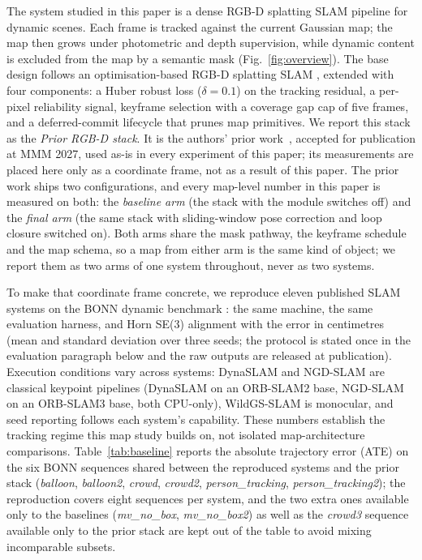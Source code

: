 \documentclass[10pt,twocolumn,letterpaper]{article}
\begin{document}
The system studied in this paper is a dense RGB-D splatting SLAM pipeline for dynamic
scenes. Each frame is tracked against the current Gaussian map; the map then grows under
photometric and depth supervision, while dynamic content is excluded from the map by a
semantic mask (Fig.~\ref{fig:overview}). The base design follows an optimisation-based
RGB-D splatting SLAM
\cite{MonoGS}, extended with four components: a Huber robust loss ($\delta=0.1$) on the
tracking residual, a per-pixel reliability signal, keyframe selection with a coverage gap
cap of five frames, and a deferred-commit lifecycle that prunes map primitives.
We report this stack as the \emph{Prior RGB-D stack}. It is the authors' prior work~\cite{RoGSSLAM},
accepted for publication at MMM 2027, used as-is in every experiment of this paper; its measurements are
placed here only as a coordinate frame, not as a result of this paper. %
The prior work ships two configurations, and every map-level number in this paper is
measured on both: the \emph{baseline arm} (the stack with the module switches off) and
the \emph{final arm} (the same stack with sliding-window pose correction and loop
closure switched on). Both arms share the mask pathway, the keyframe schedule and the
map schema, so a map from either arm is the same kind of object; we report them as
two arms of one system throughout, never as two systems. %

To make that coordinate frame concrete, we reproduce eleven published SLAM systems on the
BONN dynamic benchmark \cite{BonnDataset}: the same machine, the same
evaluation harness, and Horn SE(3) alignment with the error in centimetres (mean and
standard deviation over three seeds; the protocol is stated once in the evaluation
paragraph below and the raw outputs are released at publication). Execution
conditions vary across systems: DynaSLAM and NGD-SLAM are classical keypoint
pipelines (DynaSLAM on an ORB-SLAM2 base, NGD-SLAM on an ORB-SLAM3 base, both
CPU-only), WildGS-SLAM is monocular, and seed reporting follows each system's
capability. These numbers establish the tracking regime this map study builds on,
not isolated map-architecture comparisons.
Table~\ref{tab:baseline} reports
the absolute trajectory
error (ATE) on the six BONN sequences shared between the reproduced systems and the prior stack
(\emph{balloon}, \emph{balloon2}, \emph{crowd}, \emph{crowd2}, \emph{person\_tracking},
\emph{person\_tracking2}); the reproduction covers eight sequences per system, and the two
extra ones available only to the baselines (\emph{mv\_no\_box}, \emph{mv\_no\_box2}) as well
as the \emph{crowd3} sequence available only to the prior stack are kept out of the table to avoid
mixing incomparable subsets.
\end{document}
